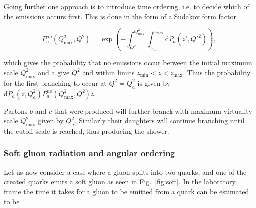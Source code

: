 Going further one approach is to introduce time ordering, i.e. to decide which of the emissions occurs first. This is done in the form of a Sudakov form factor~\cite{missing}

\begin{equation}
P_a^{no}\left(Q^2_\mathrm{max},Q^2\right) = \exp \left(- \int_{Q^2}^{Q^2_\mathrm{max}}\int_{z_\mathrm{min}}^{z_\mathrm{max}} \mathrm{d} P_a \left(z',Q'^2\right)\right),
\end{equation} 

\noindent which gives the probability that no emissions occur between the initial maximum scale $Q^2_\mathrm{max}$ and a give $Q^2$ and within limits $z_\mathrm{min} < z < z_\mathrm{max}$. Thus the probability for the first branching to occur at $Q^2=Q^2_a$ is given by $\mathrm{d}P_a \left(z,Q^2_a\right) P_a^{no}\left(Q^2_\mathrm{max},Q^2\right)z$.

Partons $b$ and $c$ that were produced will further branch with maximum virtuality scale $Q^2_\mathrm{max}$ given by $Q^2_a$. Similarly their daughters will continue branching until the cutoff scale is reached, thus producing the shower. 

\begin{figure}[h]
\centering
{}
\end{figure}




\subsubsection{Soft gluon radiation and angular ordering}
Let us now consider a case where a gluon splits into two quarks, and one of the created quarks emits a soft gluon as seen in Fig.~\ref{fig:soft}. In the laboratory frame the time it takes for a gluon to be emitted from a quark can be estimated to be

